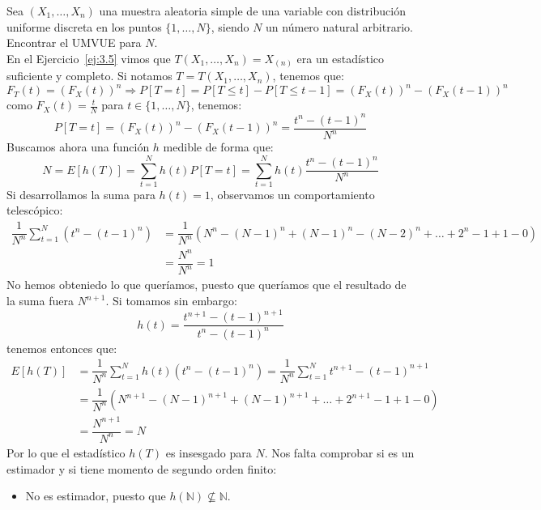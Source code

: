 \begin{ejercicio}
    Sea $(X_1, \ldots, X_n)$ una muestra aleatoria simple de una variable con distribución uniforme discreta en los puntos $\{1,\ldots,N\}$, siendo $N$ un número natural arbitrario. Encontrar el UMVUE para $N$.\\

    \noindent
    En el Ejercicio~\ref{ej:3.5} vimos que $T(X_1, \ldots, X_n) = X_{(n)}$ era un estadístico suficiente y completo. Si notamos $T = T(X_1,\ldots, X_n)$, tenemos que:
    \begin{equation*}
        F_T(t) = {(F_X(t))}^{n} \Longrightarrow P[T=t] = P[T\leq t] - P[T\leq t-1] = {(F_X(t))}^{n}-{(F_X(t-1))}^{n}
    \end{equation*}
    como $F_X(t) = \frac{t}{N}$ para $t\in \{1,\ldots,N\}$, tenemos:
    \begin{equation*}
        P[T=t] = {(F_X(t))}^{n}-{(F_X(t-1))}^{n} = \dfrac{t^n - {(t-1)}^{n}}{N^n}
    \end{equation*} 
    Buscamos ahora una función $h$ medible de forma que:
    \begin{equation*}
        N = E[h(T)] = \sum_{t=1}^{N}h(t) P[T=t] = \sum_{t=1}^{N}h(t)\dfrac{t^n-{(t-1)}^{n}}{N^n}
    \end{equation*}
    Si desarrollamos la suma para $h(t) = 1$, observamos un comportamiento telescópico:
    \begin{align*}
        \dfrac{1}{N^n}\sum_{t=1}^{N}(t^n - {(t-1)}^{n}) &= \dfrac{1}{N^n}(N^n - {(N-1)}^{n} + {(N-1)}^{n} - {(N-2)}^{n} + \ldots + 2^n - 1 + 1 - 0) \\
                                                        &= \dfrac{N^n}{N^n} = 1
    \end{align*}
    No hemos obteniedo lo que queríamos, puesto que queríamos que el resultado de la suma fuera $N^{n+1}$. Si tomamos sin embargo:
    \begin{equation*}
        h(t) = \dfrac{t^{n+1}-{(t-1)}^{n+1}}{t^n - {(t-1)}^{n}}
    \end{equation*}
    tenemos entonces que:
    \begin{align*}
        E[h(T)] &= \dfrac{1}{N^n}\sum_{t=1}^{N}h(t) (t^n-{(t-1)}^{n}) = \dfrac{1}{N^n}\sum_{t=1}^{N}t^{n+1}-{(t-1)}^{n+1} \\
                &= \dfrac{1}{N^n}(N^{n+1}-{(N-1)}^{n+1} + {(N-1)}^{n+1} + \ldots + 2^{n+1} - 1 + 1 -0) \\ 
                &= \dfrac{N^{n+1}}{N^n} = N
    \end{align*}
    Por lo que el estadístico $h(T)$ es insesgado para $N$. Nos falta comprobar si es un estimador y si tiene momento de segundo orden finito:
    \begin{itemize}
        \item No es estimador, puesto que $h(\mathbb{N})\nsubseteq \mathbb{N}$.
    \end{itemize}
\end{ejercicio}

